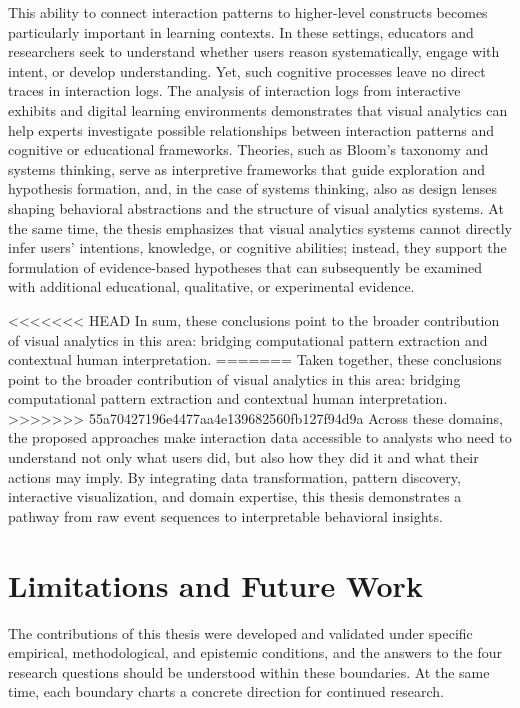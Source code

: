 This ability to connect interaction patterns to higher-level constructs becomes particularly important in learning contexts.
In these settings, educators and researchers seek to understand whether users reason systematically, engage with intent, or develop understanding.
Yet, such cognitive processes leave no direct traces in interaction logs.
The analysis of interaction logs from interactive exhibits and digital learning environments demonstrates that visual analytics can help experts investigate possible relationships between interaction patterns and cognitive or educational frameworks.
Theories, such as Bloom's taxonomy and systems thinking, serve as interpretive frameworks that guide exploration and hypothesis formation, and, in the case of systems thinking, also as design lenses shaping behavioral abstractions and the structure of visual analytics systems.
At the same time, the thesis emphasizes that visual analytics systems cannot directly infer users' intentions, knowledge, or cognitive abilities; instead, they support the formulation of evidence-based hypotheses that can subsequently be examined with additional educational, qualitative, or experimental evidence.

<<<<<<< HEAD
In sum, these conclusions point to the broader contribution of visual analytics in this area: bridging computational pattern extraction and contextual human interpretation.
=======
Taken together, these conclusions point to the broader contribution of visual analytics in this area: bridging computational pattern extraction and contextual human interpretation.
>>>>>>> 55a70427196e4477aa4e139682560fb127f94d9a
Across these domains, the proposed approaches make interaction data accessible to analysts who need to understand not only what users did, but also how they did it and what their actions may imply.
By integrating data transformation, pattern discovery, interactive visualization, and domain expertise, this thesis demonstrates a pathway from raw event sequences to interpretable behavioral insights.





\section{Limitations and Future Work}

The contributions of this thesis were developed and validated under specific empirical, methodological, and epistemic conditions, and the answers to the four research questions should be understood within these boundaries.
At the same time, each boundary charts a concrete direction for continued research.


